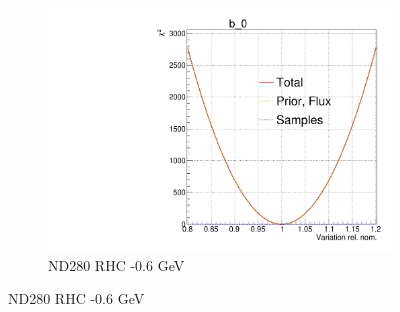 \begin{figure}[h]
\begin{subfigure}[t]{0.32\textwidth}
	\includegraphics[width=\textwidth, trim={0mm 0mm 0mm 11mm}, clip,page=30]{figures/mach3/Asimov/Full_LLHscan_18July_BeRPA_U_ND280logL_scan}
	\caption{ND280 RHC -0.6 GeV}
\end{subfigure}


\end{figure}
